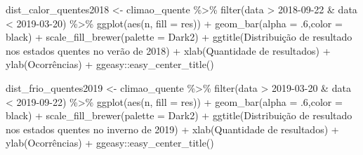 \documentclass[
]{article}
\newenvironment{Shaded}{\begin{snugshade}}{\end{snugshade}}
\newcommand{\AttributeTok}[1]{\textcolor[rgb]{0.77,0.63,0.00}{#1}}
\newcommand{\DecValTok}[1]{\textcolor[rgb]{0.00,0.00,0.81}{#1}}
\newcommand{\FunctionTok}[1]{\textcolor[rgb]{0.00,0.00,0.00}{#1}}
\newcommand{\NormalTok}[1]{#1}
\newcommand{\OtherTok}[1]{\textcolor[rgb]{0.56,0.35,0.01}{#1}}
\newcommand{\SpecialCharTok}[1]{\textcolor[rgb]{0.00,0.00,0.00}{#1}}
\newcommand{\StringTok}[1]{\textcolor[rgb]{0.31,0.60,0.02}{#1}}
\begin{document}
\begin{Shaded}
\begin{Highlighting}[]
\NormalTok{dist\_calor\_quentes2018 }\OtherTok{\textless{}{-}}\NormalTok{ climao\_quente }\SpecialCharTok{\%\textgreater{}\%} 
  \FunctionTok{filter}\NormalTok{(data }\SpecialCharTok{\textgreater{}} \StringTok{\textquotesingle{}2018{-}09{-}22\textquotesingle{}} \SpecialCharTok{\&}\NormalTok{ data }\SpecialCharTok{\textless{}} \StringTok{\textquotesingle{}2019{-}03{-}20\textquotesingle{}}\NormalTok{) }\SpecialCharTok{\%\textgreater{}\%}
  \FunctionTok{ggplot}\NormalTok{(}\FunctionTok{aes}\NormalTok{(n, }\AttributeTok{fill =}\NormalTok{ res)) }\SpecialCharTok{+} 
  \FunctionTok{geom\_bar}\NormalTok{(}\AttributeTok{alpha =}\NormalTok{ .}\DecValTok{6}\NormalTok{,}\AttributeTok{color =} \StringTok{\textquotesingle{}black\textquotesingle{}}\NormalTok{) }\SpecialCharTok{+} 
  \FunctionTok{scale\_fill\_brewer}\NormalTok{(}\AttributeTok{palette =} \StringTok{\textquotesingle{}Dark2\textquotesingle{}}\NormalTok{) }\SpecialCharTok{+}
  \FunctionTok{ggtitle}\NormalTok{(}\StringTok{\textquotesingle{}Distribuição de resultado nos estados quentes no verão de 2018\textquotesingle{}}\NormalTok{) }\SpecialCharTok{+}
  \FunctionTok{xlab}\NormalTok{(}\StringTok{\textquotesingle{}Quantidade de resultados\textquotesingle{}}\NormalTok{) }\SpecialCharTok{+} \FunctionTok{ylab}\NormalTok{(}\StringTok{\textquotesingle{}Ocorrências\textquotesingle{}}\NormalTok{) }\SpecialCharTok{+}
\NormalTok{  ggeasy}\SpecialCharTok{::}\FunctionTok{easy\_center\_title}\NormalTok{()}


\NormalTok{dist\_frio\_quentes2019 }\OtherTok{\textless{}{-}}\NormalTok{ climao\_quente }\SpecialCharTok{\%\textgreater{}\%} 
  \FunctionTok{filter}\NormalTok{(data }\SpecialCharTok{\textgreater{}} \StringTok{\textquotesingle{}2019{-}03{-}20\textquotesingle{}} \SpecialCharTok{\&}\NormalTok{ data }\SpecialCharTok{\textless{}} \StringTok{\textquotesingle{}2019{-}09{-}22\textquotesingle{}}\NormalTok{) }\SpecialCharTok{\%\textgreater{}\%}
  \FunctionTok{ggplot}\NormalTok{(}\FunctionTok{aes}\NormalTok{(n, }\AttributeTok{fill =}\NormalTok{ res)) }\SpecialCharTok{+} 
  \FunctionTok{geom\_bar}\NormalTok{(}\AttributeTok{alpha =}\NormalTok{ .}\DecValTok{6}\NormalTok{,}\AttributeTok{color =} \StringTok{\textquotesingle{}black\textquotesingle{}}\NormalTok{) }\SpecialCharTok{+} 
  \FunctionTok{scale\_fill\_brewer}\NormalTok{(}\AttributeTok{palette =} \StringTok{\textquotesingle{}Dark2\textquotesingle{}}\NormalTok{) }\SpecialCharTok{+}
  \FunctionTok{ggtitle}\NormalTok{(}\StringTok{\textquotesingle{}Distribuição de resultado nos estados quentes no inverno de 2019\textquotesingle{}}\NormalTok{) }\SpecialCharTok{+}
  \FunctionTok{xlab}\NormalTok{(}\StringTok{\textquotesingle{}Quantidade de resultados\textquotesingle{}}\NormalTok{) }\SpecialCharTok{+} \FunctionTok{ylab}\NormalTok{(}\StringTok{\textquotesingle{}Ocorrências\textquotesingle{}}\NormalTok{) }\SpecialCharTok{+}
\NormalTok{  ggeasy}\SpecialCharTok{::}\FunctionTok{easy\_center\_title}\NormalTok{()}


\end{Highlighting}
\end{Shaded}
\end{document}
